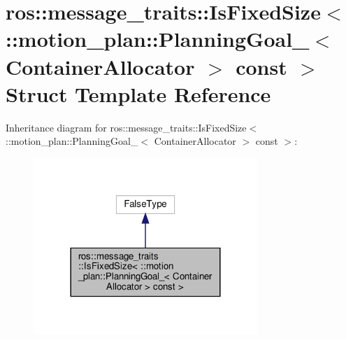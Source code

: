 \hypertarget{structros_1_1message__traits_1_1IsFixedSize_3_01_1_1motion__plan_1_1PlanningGoal___3_01ContainerAllocator_01_4_01const_01_4}{}\section{ros\+:\+:message\+\_\+traits\+:\+:Is\+Fixed\+Size$<$ \+:\+:motion\+\_\+plan\+:\+:Planning\+Goal\+\_\+$<$ Container\+Allocator $>$ const $>$ Struct Template Reference}
\label{structros_1_1message__traits_1_1IsFixedSize_3_01_1_1motion__plan_1_1PlanningGoal___3_01ContainerAllocator_01_4_01const_01_4}


Inheritance diagram for ros\+:\+:message\+\_\+traits\+:\+:Is\+Fixed\+Size$<$ \+:\+:motion\+\_\+plan\+:\+:Planning\+Goal\+\_\+$<$ Container\+Allocator $>$ const $>$\+:
\nopagebreak
\begin{figure}[H]
\begin{center}
\leavevmode
\includegraphics[width=240pt]{structros_1_1message__traits_1_1IsFixedSize_3_01_1_1motion__plan_1_1PlanningGoal___3_01Container89d3dfb56d675b7de2c307ff1440f6b3}
\end{center}
\end{figure}


